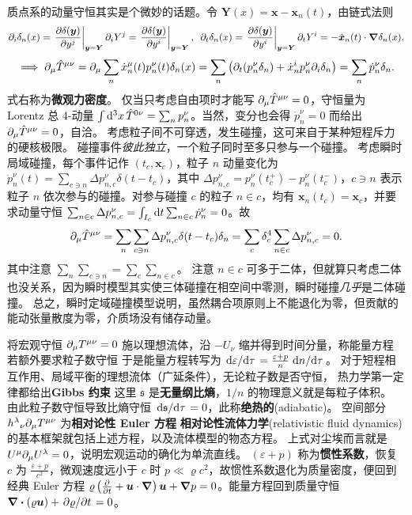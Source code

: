 质点系的动量守恒其实是个微妙的话题。令 $\bm Y(x) = \bm x-\bm x_n(t)$，由链式法则
\[
    \p_i\delta_n(x) = \eval{\pdv{\delta(\bm y)}{y^j}}_{\bm y = \bm Y} \p_i Y^j = \eval{\pdv{\delta(\bm y)}{y^i}}_{\bm y = \bm Y},\enskip\p_t\delta_n(x) = \eval{\pdv{\delta(\bm y)}{y^i}}_{\bm y = \bm Y} \p_t Y^i = -\dot{\bm x}_n(t)\cdot\grad\delta_n(x).
\]
\[\implies\partial_\mu \hat T^{\mu\nu} = \partial_\mu \sum_n \dot x^\mu_n(t) p^\nu_n(t) \delta_n(x)= \sum_n \left(\partial_t(p^\nu_n \delta_n) + \dot x^i_n p^\nu_n \partial_i\delta_n\right) = \sum_n \dot p^\nu_n \delta_n.\]
式右称为\textbf{微观力密度}。
仅当只考虑自由项时才能写 $\partial_\mu \hat T^{\mu\nu}=0$，守恒量为 Lorentz 总 4-动量 $\int\dd[3]{x} \hat T^{0\nu} = \sum_n p^\nu_n$。当然，变分也会得 $\dot p^\nu_n=0$ 而给出 $\partial_\mu \hat T^{\mu\nu}=0$，自洽。
考虑粒子间不可穿透，发生碰撞，这可来自于某种短程斥力的硬核极限。
碰撞事件\emph{彼此独立}，一个粒子同时至多只参与一个碰撞。
考虑瞬时局域碰撞，每个事件记作 $(t_c,\bm x_c)$，粒子 $n$ 动量变化为 $\dot p^\nu_n(t) = \sum_{c\ni n}\Delta p_{n,c}^\nu \delta(t-t_c)$，其中 $\Delta p_{n,c}^\nu=p_n^\nu(t_c^+) - p_n^\nu(t_c^-)$，$c\ni n$ 表示粒子 $n$ 依次参与的碰撞。对参与碰撞 $c$ 的粒子 $n\in c$，均有 $\bm x_n(t_c)=\bm x_c$，并要求动量守恒 $\sum_{n\in c} \Delta p_{n,c}^\nu = \int_{I_c}\dd t \sum_{n\in c}\dot p^\nu_n = 0$。故
\[
    \partial_\mu \hat T^{\mu\nu} = \sum_n\sum_{c\ni n} \Delta p_{n,c}^\nu \delta(t-t_c)\delta_n = \sum_c \delta^4_c\sum_{n\in c} \Delta p_{n,c}^\nu = 0.
\]
其中注意 $\sum_n\sum_{c\ni n}=\sum_c\sum_{n\in c}$。
注意 $n\in c$ 可多于二体，但就算只考虑二体也没关系，因为瞬时模型其实使三体碰撞在相空间中零测，瞬时碰撞\emph{几乎}是二体碰撞。
总之，瞬时定域碰撞模型说明，虽然耦合项原则上不能退化为零，但贡献的能动张量散度为零，介质场没有储存动量。

将宏观守恒 $\partial_\mu T^{\mu\nu} = 0$ 施以理想流体，沿 $-U_\nu$ 缩并得到时间分量，称能量方程
若额外要求粒子数守恒
于是能量方程转写为 $\dv*{\varepsilon}{\tau} = \frac{\varepsilon+p}{n}\dv*{n}{\tau}$。
对于短程相互作用、局域平衡的理想流体（广延条件），无论粒子数是否守恒，
热力学第一定律都给出\textbf{Gibbs 约束}
这里 $\mathfrak s$ 是\textbf{无量纲比熵}，$1/n$ 的物理意义就是每粒子体积。
由此粒子数守恒导致比熵守恒 $\dv*{\mathfrak s}{\tau}=0$，此称\textbf{绝热的}(adiabatic)。
空间部分 $h^{\lambda}{}_\nu \partial_\mu T^{\mu\nu}$ 为\textbf{相对论性 Euler 方程}
\textbf{相对论性流体力学}(relativistic fluid dynamics)的基本框架就包括上述方程，以及流体模型的物态方程。
上式对尘埃而言就是 $U^\mu\partial_\mu U^\lambda = 0$，说明宏观运动的确化为单流直线。
$(\varepsilon+p)$ 称为\textbf{惯性系数}，恢复 $c$ 为 $\frac{\varepsilon+p}{c^2}$，微观速度远小于 $c$ 时 $p \ll \varrho c^2$，故惯性系数退化为质量密度，便回到经典 Euler 方程 $\varrho\left(\pdv{t}+\bm u\cdot\grad\right)\bm u+\grad p=0$。能量方程回到质量守恒 $\div(\varrho\bm u)+ \pdv*{\varrho}{t} = 0$。


